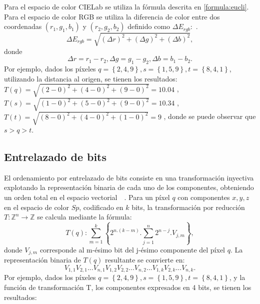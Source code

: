 Para el espacio de color CIELab se utiliza la fórmula descrita en \ref{formula:eucli}. Para el espacio de color RGB se utiliza la diferencia de color entre dos coordenadas $(r_{1},g_{1},b_{1})$ y $(r_{2},g_{2},b_{2})$ definido como $\Delta E_{rgb}$:~\cite{robertson1977cie}.
\begin{equation}
\label{formula:euclirgb}
\Delta E_{rgb} = \sqrt{(\Delta r)^2 + (\Delta g)^2 +(\Delta b)^2},
\end{equation}
donde 
\begin{equation}
\Delta r = r_{1} - r_{2},
\Delta g = g_{1} - g_{2},
\Delta b = b_{1} - b_{2}.
\end{equation}
Por ejemplo, dados los píxeles $q=\left\{2,4,9\right\}, s=\left\{1,5,9\right\}, t=\left\{8,4,1\right\}$, utilizando la distancia al origen, se tienen los resultados:
$T(q)=\sqrt{(2-0)^{2}+(4-0)^{2}+(9-0)^{2}}=10.04$ ,
$T(s)=\sqrt{(1-0)^{2}+(5-0)^{2}+(9-0)^{2}}=10.34$ ,
$T(t)=\sqrt{(8-0)^{2}+(4-0)^{2}+(1-0)^{2}}=9$ , donde se puede observar que $s>q>t$.


\subsection{Entrelazado de bits}
\label{chap:marco-entrelazado}
El ordenamiento por entrelazado de bits consiste en una transformación inyectiva explotando la representación binaria de cada uno de los componentes, obteniendo un orden total en el espacio vectorial~\cite{chanussot1997bit}~\cite{chanussot1998total}.
Para un píxel $q$ con componentes ${x,y,z}$ en el espacio de color $Sp$, codificado en $k$ bits, la transformación por reducción $T: \mathbb{Z}^{n}\rightarrow \mathbb{Z}$ se calcula mediante la fórmula:
 
  
 
 
\begin{equation}
T\left(q\right):\sum_{m=1}^k\left\{
2^{n.(k-m)}.\sum_{j=1}^n 2^{n-j}.V_{j,m}\right\},
\end{equation}
donde $V_{j,m}$ corresponde al m-ésimo bit del j-ésimo componente del píxel $q$. La representación binaria de $T(q)$ resultante se convierte en:
\begin{equation}
V_{1,1}V_{2,1}...V_{n,1}V_{1,2}V_{2,2}...V_{n,2}...V_{1,k}V_{2,k}...V_{n,k}.
\end{equation}
Por ejemplo, dados los píxeles $q=\left\{2,4,9\right\}, s=\left\{1,5,9\right\}, t=\left\{8,4,1\right\}$, y la función de transformación T, los componentes expresados en 4 bits, se tienen los resultados:

